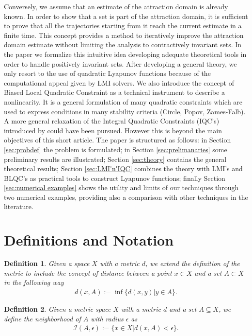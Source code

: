 \documentclass[letterpaper,10pt,twocolumn,journal,final]{IEEEtran}
\newtheorem{dfn}{Definition}
\newcommand{\eps}{\epsilon}
\begin{document}
Conversely, we assume that an estimate of the attraction domain is already known. In order to show that a set is part of the attraction domain, it is sufficient to prove that all the trajectories starting from it reach the current estimate in a finite time.
This concept provides a method to iteratively improve the attraction domain estimate without limiting the analysis to contractively invariant sets.
In the paper we formalize this intuitive idea developing adequate theoretical tools in order to handle positively invariant sets. After developing a general theory, we only resort to the use of quadratic Lyapunov functions because of the computational appeal given by LMI solvers. We also introduce the concept of Biased Local Quadratic Constraint as a technical instrument to describe a nonlinearity. It is a general formulation of many quadratic constraints which are used to express conditions in many stability criteria (Circle, Popov, Zames-Falb). A more general relaxation of the Integral Quadratic Constraints (IQC's) introduced by \cite{MegRan97} could have been pursued. However this is beyond the main objectives of this short article.
The paper is structured as follows: in Section \ref{sec:probdef} the problem is formulated; in Section \ref{sec:prelimanaries} some preliminary results are illustrated; Section \ref{sec:theory} contains the general theoretical results; Section \ref{sec:LMI'n'IQC} combines the theory with LMI's and BLQC's as practical tools to construct Lyapunov functions; finally Section \ref{sec:numerical examples} shows the utility and limits of our techniques through two numerical examples, providing also a comparison with other techniques in the literature.

\section{Definitions and Notation}
\begin{dfn}
	Given a space $X$ with a metric $d$, we extend the definition of the metric to include the concept of distance between a point $x\in X$ and a set $A\subset X$ in the following way
	\begin{align}
		d(x,A):=\inf\{d(x,y)| y\in A\}.
	\end{align}
\end{dfn}
\begin{dfn}
	Given a metric space $X$ with a metric $d$ and a set $A \subseteq X$, we define the neighborhood of $A$ with radius $\eps$ as
	\begin{align}
		\mathcal{I}(A,\eps):=\{x\in X| d(x,A)<\eps \}.
	\end{align}
\end{dfn}
\end{document}
